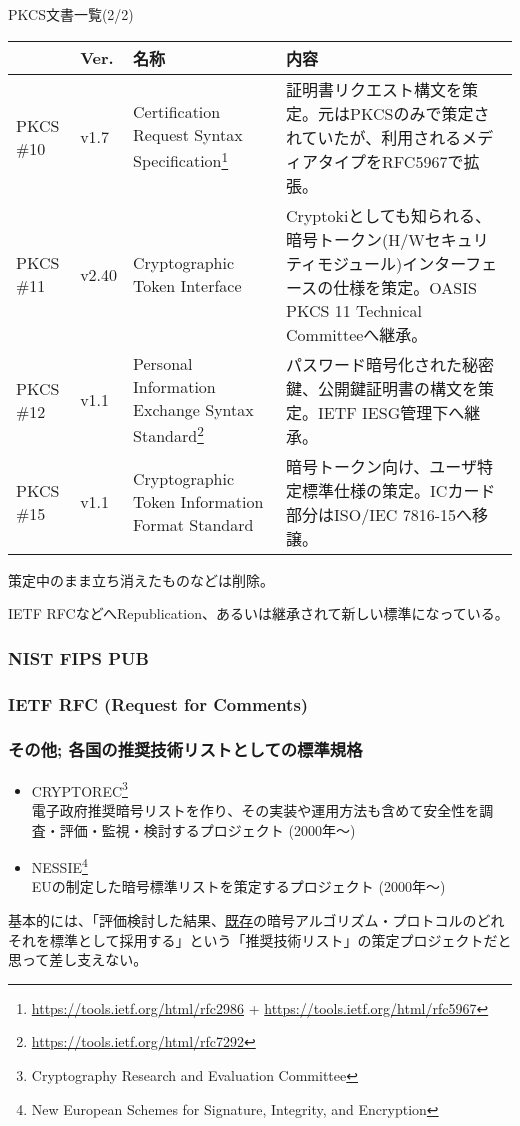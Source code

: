 \documentclass[12pt,dvipdfmx]{beamer}
\begin{document}
\begin{frame}
PKCS文書一覧(2/2)
\begin{table}
\scriptsize
\begin{tabular}{|l|l|p{21ex}|p{40ex}|}
\hline
 & Ver. & 名称 & 内容 \\
\hline\hline
PKCS \#10 & v1.7 & Certification Request Syntax Specification\footnote[frame]{\scriptsize \url{https://tools.ietf.org/html/rfc2986} + \url{https://tools.ietf.org/html/rfc5967}} & 証明書リクエスト構文を策定。元はPKCSのみで策定されていたが、利用されるメディアタイプをRFC5967で拡張。\\
\hline
PKCS \#11 & v2.40 & Cryptographic Token Interface & Cryptokiとしても知られる、暗号トークン(H/Wセキュリティモジュール)インターフェースの仕様を策定。OASIS PKCS 11 Technical Committeeへ継承。\\
\hline
PKCS \#12 & v1.1 & Personal Information Exchange Syntax Standard\footnote[frame]{\scriptsize \url{https://tools.ietf.org/html/rfc7292}} & パスワード暗号化された秘密鍵、公開鍵証明書の構文を策定。IETF IESG管理下へ継承。\\
\hline
PKCS \#15 & v1.1 & Cryptographic Token Information Format Standard & 暗号トークン向け、ユーザ特定標準仕様の策定。ICカード部分はISO/IEC 7816-15へ移譲。\\
\hline
\end{tabular}
\end{table}
策定中のまま立ち消えたものなどは削除。

IETF RFCなどへRepublication、あるいは継承されて新しい標準になっている。
\end{frame}

\begin{frame}
\frametitle{NIST FIPS PUB}
\end{frame}

\begin{frame}
\frametitle{IETF RFC (Request for Comments)}
\end{frame}

\begin{frame}
\frametitle{その他; 各国の推奨技術リストとしての標準規格}
\small
\begin{itemize}
 \item CRYPTOREC\footnote[frame]{\scriptsize Cryptography Research and Evaluation Committee} \\
電子政府推奨暗号リストを作り、その実装や運用方法も含めて安全性を調査・評価・監視・検討するプロジェクト (2000年〜)
 \item NESSIE\footnote[frame]{\scriptsize New European Schemes for Signature, Integrity, and Encryption}\\
EUの制定した暗号標準リストを策定するプロジェクト (2000年〜)
\end{itemize}
基本的には、「評価検討した結果、\underline{既存}の暗号アルゴリズム・プロトコルのどれそれを標準として採用する」という\alert{「推奨技術リスト」の策定プロジェクト}だと思って差し支えない。
\end{frame}
\end{document}
